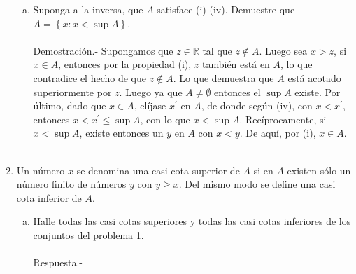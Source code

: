 \begin{enumerate}[\bfseries 1.]
\begin{enumerate}[(a)]
	    \item Suponga a la inversa, que $A$ satisface (i)-(iv). Demuestre que $A=\left\{x:x<\sup A\right\}$.\\\\
		Demostración.-\; Supongamos que $z\in \mathbb{R}$ tal que $z\notin A$. Luego sea $x>z$, si $x\in A$, entonces por la propiedad (i), $z$ también está en $A$, lo que contradice el hecho de que $z\notin A.$ Lo que demuestra que $A$ está acotado superiormente por $z$. Luego ya que $A\neq \emptyset$ entonces el $\sup A$ existe. Por último, dado que $x\in A$, elíjase $x^{'}$ en $A$, de donde según (iv), con $x<x^{'}$, entonces $x<x^{'}\leq \sup A$, con lo que $x<\sup A$. Recíprocamente, si $x<\sup A$, existe entonces un $y$ en $A$ con $x<y$. De aquí, por (i), $x\in A.$\\\\

	\end{enumerate}

    \item Un número $x$ se denomina una casi cota superior de $A$ si en $A$ existen sólo un número finito de números $y$ con $y\geq x.$ Del mismo modo se define una casi cota inferior de $A$.

	\begin{enumerate}[(a)]

	    \item Halle todas las casi cotas superiores y todas las casi cotas inferiores de los conjuntos del problema 1.\\\\

		Respuesta.-\; \\ 
		\begin{enumerate}[(i)]


\end{enumerate}
\end{enumerate}
\end{enumerate}
